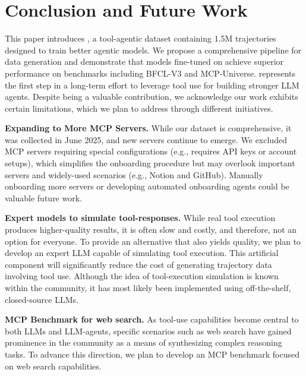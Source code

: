 \section{Conclusion and Future Work}

This paper introduces \dataname, a tool-agentic dataset containing 1.5M trajectories designed to train better agentic models. We propose a comprehensive pipeline for data generation and demonstrate that models fine-tuned on \dataname achieve superior performance on benchmarks including BFCL-V3 and MCP-Universe.
\dataname represents the first step in a long-term effort to leverage tool use for building stronger LLM agents. Despite being a valuable contribution, we acknowledge our work exhibits certain limitations, which we plan to address through different initiatives.

\textbf{Expanding to More MCP Servers.} While our dataset is comprehensive, it was collected in June 2025, and new servers continue to emerge. We excluded MCP servers requiring special configurations (e.g., requires API keys or account setups), which simplifies the onboarding procedure but may overlook important servers and widely-used scenarios (e.g., Notion and GitHub). Manually onboarding more servers or developing automated onboarding agents could be valuable future work.

\textbf{Expert models to simulate tool-responses.} While real tool execution produces higher-quality results, it is often slow and costly, and therefore, not an option for everyone. To provide an alternative that also yields quality, we plan to develop an expert LLM capable of simulating tool execution. This artificial component will significantly reduce the cost of generating trajectory data involving tool use. Although the idea of tool-execution simulation is known within the community, it has most likely been implemented using off-the-shelf, closed-source LLMs.

\textbf{MCP Benchmark for web search.} As tool-use capabilities become central to both LLMs and LLM-agents, specific scenarios such as web search have gained prominence in the community as a means of synthesizing complex reasoning tasks. To advance this direction, we plan to develop an MCP benchmark focused on web search capabilities.